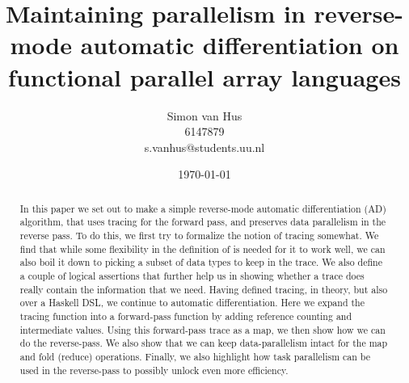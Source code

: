 \documentclass{paper}
\title{Maintaining parallelism in reverse-mode automatic differentiation on functional parallel array languages}
\author{Simon van Hus\\6147879\\s.vanhus@students.uu.nl}
\date{\today}
\renewcommand{\|}{\ |\ }
\begin{document}
    \maketitle

    \begin{abstract}
        In this paper we set out to make a simple reverse-mode automatic differentiation (AD) algorithm, that uses tracing for the forward pass, and preserves data parallelism in the reverse pass.
        To do this, we first try to formalize the notion of tracing somewhat.
        We find that while some flexibility in the definition of is needed for it to work well, we can also boil it down to picking a subset of data types to keep in the trace.
        We also define a couple of logical assertions that further help us in showing whether a trace does really contain the information that we need.
        Having defined tracing, in theory, but also over a Haskell DSL, we continue to automatic differentiation.
        Here we expand the tracing function into a forward-pass function by adding reference counting and intermediate values.
        Using this forward-pass trace as a map, we then show how we can do the reverse-pass.
        We also show that we can keep data-parallelism intact for the map and fold (reduce) operations.
        Finally, we also highlight how task parallelism can be used in the reverse-pass to possibly unlock even more efficiency.
    \end{abstract}

    

    

    

    

    \clearpage
    
    
    \clearpage
    \appendix
    
\end{document}
